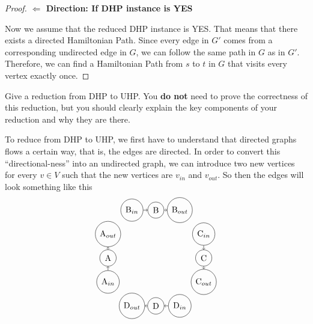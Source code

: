 \documentclass[11pt,fleqn]{exam}
\newenvironment{soln}{\color{solnblue}}{}
\newif\ifsolutions\solutionsfalse
\begin{document}
\begin{questions}
\begin{soln}
\begin{proof}
                  \textbf{$\Leftarrow$ Direction: If DHP instance is YES}

                  Now we assume that the reduced DHP instance is YES.
                  That means that there exists a directed Hamiltonian Path.
                  Since every edge in $G\prime$ comes from a corresponding undirected
                  edge in $G$, we can follow the same path in $G$ as in $G\prime$.
                  Therefore, we can find a Hamiltonian Path from $s$ to $t$ in $G$ 
                  that visits every vertex exactly once.
            \end{proof}
      \end{soln}


    \ifsolutions\fi

    \question[7] Give a reduction from DHP to UHP. You \textbf{do not} need to prove the correctness of this reduction, but you should clearly explain the key components of your reduction and why they are there.

    \begin{soln}
      To reduce from DHP to UHP, we first have to understand that directed graphs
      flows a certain way, that is, the edges are directed. 
      In order to convert this ``directional-ness'' into an undirected graph, we can introduce
      two new vertices for every $v \in V$ such that the 
      new vertices are $v_{in}$ and $v_{out}$. So then the edges will look something like this
      \[
      \begin{tikzpicture}
            \node[draw, circle] (A) at (0, 0) {A};
            \node[draw, circle] (B) at (2, 2) {B};
            \node[draw, circle] (C) at (4, 0) {C};
            \node[draw, circle] (D) at (2, -2) {D};


            \node[draw, circle] (A_in) at (0, -1) {A$_{in}$};
            \draw[->] (A_in) -- (A);
            \node[draw, circle] (A_out) at (0, 1) {A$_{out}$};
            \draw[->] (A) -- (A_out);

            \node[draw, circle] (B_in) at (1, 2) {B$_{in}$};
            \draw[->] (B_in) -- (B);
            \node[draw, circle] (B_out) at (3, 2) {B$_{out}$};
            \draw[->] (B) -- (B_out);

            \node[draw, circle] (C_in) at (4, 1) {C$_{in}$};
            \draw[->] (C_in) -- (C);
            \node[draw, circle] (C_out) at (4, -1) {C$_{out}$};
            \draw[->] (C) -- (C_out);

            \node[draw, circle] (D_in) at (3, -2) {D$_{in}$};
            \draw[->] (D_in) -- (D);
            \node[draw, circle] (D_out) at (1, -2) {D$_{out}$};
            \draw[->] (D) -- (D_out);
            

\end{tikzpicture}\]
\end{soln}
\end{questions}
\end{document}
